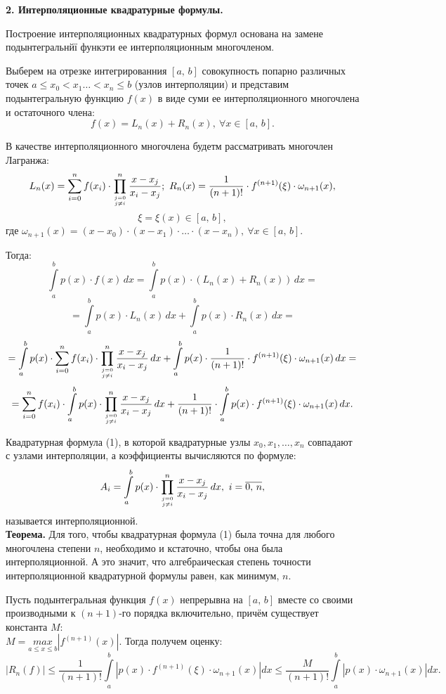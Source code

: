 \documentclass[14pt,a4paper,titlepage]{extarticle}
\begin{document}
{\bf 2. Интерполяционные квадратурные формулы.}

Построение интерполяционных квадратурных формул основана на замене подынтегральнйї функэти ее интерполяционным многочленом.

Выберем на отрезке интегрированния $[a,\, b]$ совокупность попарно различных точек $a\leqslant x_0<x_1\ldots <x_n\leqslant b$ (узлов интерполяции) и представим подынтегральную функцию $f(x)$ в виде суми ее интерполяционного многочлена и остаточного члена:
$$f(x)=L_n(x)+R_n(x),\ \forall x\in [a,\, b].$$

В качестве интерполяционного многочлена будетм рассматривать многочлен Лагранжа:
$$L_n(x)=\sum_{i=0}^n f(x_i)\cdot\prod_{\genfrac{}{}{0pt}{}{j=0}{j\neq i}}^n\frac{x-x_j}{x_i-x_j};\ R_n(x)=\frac{1}{(n+1)!}\cdot f^{(n+1)}(\xi)\cdot \omega _{n+1}(x),$$
$$\xi=\xi (x)\in [a,\, b],$$
где $\omega _{n+1}(x) =(x-x_0)\cdot (x-x_1)\cdot\ldots\cdot (x-x_n),\ \forall x\in [a,\, b].$

Тогда: 
$$\int\limits_a^b p(x)\cdot f(x)\, dx=\int\limits_a^b p(x)\cdot (L_n(x)+R_n(x))\, dx=$$
$$=\int\limits_a^b p(x)\cdot L_n(x)\, dx+\int\limits_a^b p(x)\cdot R_n(x)\, dx=$$
$$=\int\limits_a^b p(x)\cdot\sum_{i=0}^n f(x_i)\cdot\prod_{\genfrac{}{}{0pt}{}{j=0}{j\neq i}}^n\frac{x-x_j}{x_i-x_j}\, dx+\int\limits_a^b p(x)\cdot\frac{1}{(n+1)!}\cdot f^{(n+1)}(\xi)\cdot \omega _{n+1}(x)\, dx=$$
$$
=\sum_{i=0}^n f(x_i)\cdot\int\limits_a^b p(x)\cdot\prod_{\genfrac{}{}{0pt}{}{j=0}{j\neq i}}^n\frac{x-x_j}{x_i-x_j}\, dx+\frac{1}{(n+1)!}\cdot\int\limits_a^b p(x)\cdot f^{(n+1)}(\xi)\cdot \omega _{n+1}(x)\, dx.
$$

Квадратурная формула (1), в которой квадратурные узлы $x_0, x_1,\ldots, x_n$ совпадают с узлами интерполяции, а коэффициенты вычисляются по формуле:
\begin{equation}
A_i=\int\limits_a^b p(x)\cdot\prod_{\genfrac{}{}{0pt}{}{j=0}{j\neq i}}^n\frac{x-x_j}{x_i-x_j}\, dx,\ i=\overline{0,\, n},
\end{equation}
называется интерполяционной.\\
{\bf Теорема.} Для того, чтобы квадратурная формула (1) была точна для любого многочлена степени $n$, необходимо и кстаточно, чтобы она была интерполяционной. А это значит, что алгебраическая степень точности интерполяционной квадратурной формулы равен, как минимум, $n$.

Пусть подынтегральная функция $f(x)$ непрерывна на $[a,\, b]$ вместе со своими производными к $(n+1)$-го порядка включительно, причём существует константа $M$:\\$M=\underset{a\leqslant x\leqslant b}{max}\left| f^{(n+1)}(x)\right|.$ Тогда получем оценку:
$$\left| R_n(f)\right|\leqslant\frac{1}{(n+1)!}\int\limits_a^b\left| p(x)\cdot f^{(n+1)}(\xi)\cdot\omega _{n+1}(x)\right| dx\leqslant\frac{M}{(n+1)!}\int\limits_a^b\left| p(x)\cdot\omega _{n+1}(x)\right| dx.$$
\end{document}
